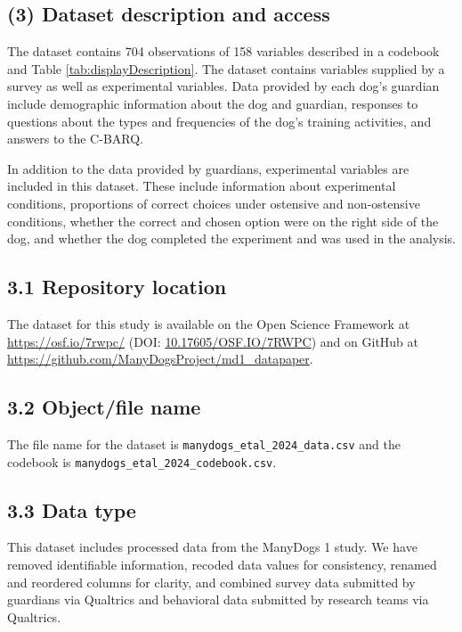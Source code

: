 \documentclass[
  pub,floatsintext]{apa6}
\begin{document}
\hypertarget{dataset-description-and-access}{%
\subsection{(3) Dataset description and access}\label{dataset-description-and-access}}

The dataset contains 704 observations of 158 variables described in a codebook and Table \ref{tab:displayDescription}. The dataset contains variables supplied by a survey as well as experimental variables. Data provided by each dog's guardian include demographic information about the dog and guardian, responses to questions about the types and frequencies of the dog's training activities, and answers to the C-BARQ.

In addition to the data provided by guardians, experimental variables are included in this dataset. These include information about experimental conditions, proportions of correct choices under ostensive and non-ostensive conditions, whether the correct and chosen option were on the right side of the dog, and whether the dog completed the experiment and was used in the analysis.

\hypertarget{repository-location}{%
\subsection{3.1 Repository location}\label{repository-location}}

The dataset for this study is available on the Open Science Framework at \url{https://osf.io/7rwpc/} (DOI: \href{https://doi.org/10.17605/OSF.IO/7RWPC}{10.17605/OSF.IO/7RWPC}) and on GitHub at \url{https://github.com/ManyDogsProject/md1_datapaper}.

\hypertarget{objectfile-name}{%
\subsection{3.2 Object/file name}\label{objectfile-name}}

The file name for the dataset is \texttt{manydogs\_etal\_2024\_data.csv} and the codebook is \texttt{manydogs\_etal\_2024\_codebook.csv}.

\hypertarget{data-type}{%
\subsection{3.3 Data type}\label{data-type}}

This dataset includes processed data from the ManyDogs 1 study. We have removed identifiable information, recoded data values for consistency, renamed and reordered columns for clarity, and combined survey data submitted by guardians via Qualtrics and behavioral data submitted by research teams via Qualtrics.
\end{document}
